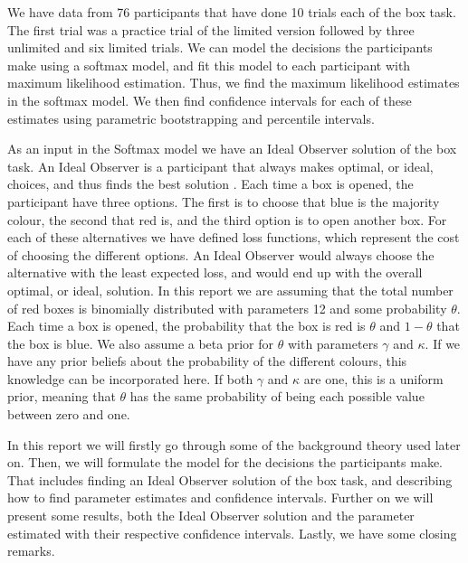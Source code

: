 We have data from 76 participants that have done 10 trials each of the box task. The first trial was a practice trial of the limited version followed by three unlimited and six limited trials. We can model the decisions the participants make using a softmax model, and fit this model to each participant with maximum likelihood estimation. Thus, we find the maximum likelihood estimates in the softmax model. We then find confidence intervals for each of these estimates using parametric bootstrapping and percentile intervals. 

As an input in the Softmax model we have an Ideal Observer solution of the box task. An Ideal Observer is a participant that always makes optimal, or ideal, choices, and thus finds the best solution \citep{idealObs}. Each time a box is opened, the participant have three options. The first is to choose that blue is the majority colour, the second that red is, and the third option is to open another box. For each of these alternatives we have defined loss functions, which represent the cost of choosing the different options. An Ideal Observer would always choose the alternative with the least expected loss, and would end up with the overall optimal, or ideal, solution. In this report we are assuming that the total number of red boxes is binomially distributed with parameters 12 and some probability $\theta$. Each time a box is opened, the probability that the box is red is $\theta$ and $1-\theta$ that the box is blue. We also assume a beta prior for $\theta$ with parameters $\gamma$ and $\kappa$. If we have any prior beliefs about the probability of the different colours, this knowledge can be incorporated here. If both $\gamma$ and $\kappa$ are one, this is a uniform prior, meaning that $\theta$ has the same probability of being each possible value between zero and one. 





In this report we will firstly go through some of the background theory used later on. Then, we will formulate the model for the decisions the participants make. That includes finding an Ideal Observer solution of the box task, and describing how to find parameter estimates and confidence intervals. Further on we will present some results, both the Ideal Observer solution and the parameter estimated with their respective confidence intervals. Lastly, we have some closing remarks. 